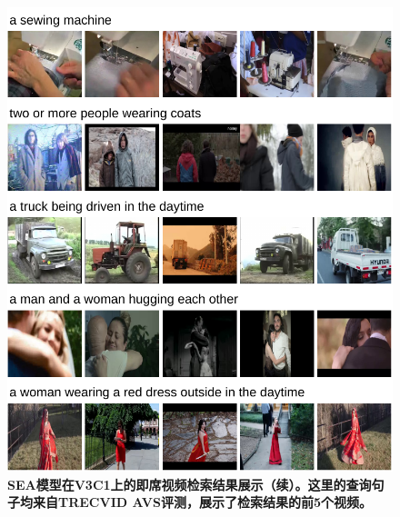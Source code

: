 \begin{figure}[tbh!]
    \centering
    \includegraphics[width=\linewidth]{figures/search_result_2}
    \caption[SEA模型在V3C1上的即席视频检索结果展示（续）]{\textbf{SEA模型在V3C1上的即席视频检索结果展示（续）。这里的查询句子均来自TRECVID AVS评测，展示了检索结果的前5个视频。}}
    \label{fig:search_result_2}
\end{figure}

